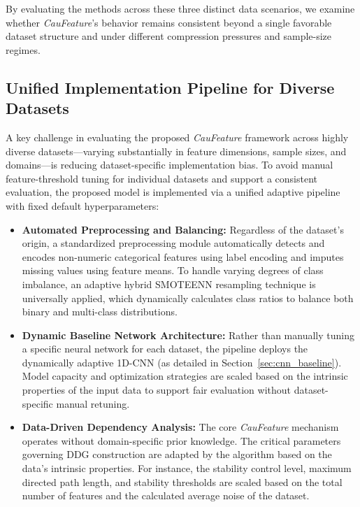 \documentclass[journal]{IEEEtran}
\begin{document}
By evaluating the methods across these three distinct data scenarios, we examine whether \textit{CauFeature}'s behavior remains consistent beyond a single favorable dataset structure and under different compression pressures and sample-size regimes.


\subsection{Unified Implementation Pipeline for Diverse Datasets}
A key challenge in evaluating the proposed \textit{CauFeature} framework across highly diverse datasets---varying substantially in feature dimensions, sample sizes, and domains---is reducing dataset-specific implementation bias. To avoid manual feature-threshold tuning for individual datasets and support a consistent evaluation, the proposed model is implemented via a unified adaptive pipeline with fixed default hyperparameters:

\begin{itemize}
    \item \textbf{Automated Preprocessing and Balancing:} Regardless of the dataset's origin, a standardized preprocessing module automatically detects and encodes non-numeric categorical features using label encoding and imputes missing values using feature means. To handle varying degrees of class imbalance, an adaptive hybrid SMOTEENN resampling technique is universally applied, which dynamically calculates class ratios to balance both binary and multi-class distributions.

    \item \textbf{Dynamic Baseline Network Architecture:} Rather than manually tuning a specific neural network for each dataset, the pipeline deploys the dynamically adaptive 1D-CNN (as detailed in Section~\ref{sec:cnn_baseline}). Model capacity and optimization strategies are scaled based on the intrinsic properties of the input data to support fair evaluation without dataset-specific manual retuning.

    \item \textbf{Data-Driven Dependency Analysis:} The core \textit{CauFeature} mechanism operates without domain-specific prior knowledge. The critical parameters governing DDG construction are adapted by the algorithm based on the data's intrinsic properties. For instance, the stability control level, maximum directed path length, and stability thresholds are scaled based on the total number of features and the calculated average noise of the dataset.
\end{itemize}
\end{document}
